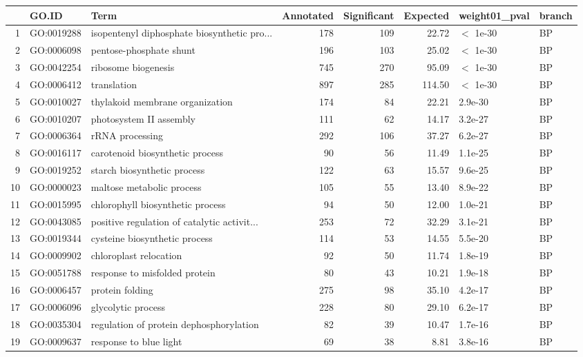 \documentclass[12pt,oneside,a4paper]{article}
\begin{document}
\begin{longtable}{rllrrrll}
  \hline
 & GO.ID & Term & Annotated & Significant & Expected & weight01\_pval & branch \\ 
  \hline
1 & GO:0019288 & isopentenyl diphosphate biosynthetic pro... & 178 & 109 & 22.72 & $<$ 1e-30 & BP \\ 
  2 & GO:0006098 & pentose-phosphate shunt & 196 & 103 & 25.02 & $<$ 1e-30 & BP \\ 
  3 & GO:0042254 & ribosome biogenesis & 745 & 270 & 95.09 & $<$ 1e-30 & BP \\ 
  4 & GO:0006412 & translation & 897 & 285 & 114.50 & $<$ 1e-30 & BP \\ 
  5 & GO:0010027 & thylakoid membrane organization & 174 &  84 & 22.21 & 2.9e-30 & BP \\ 
  6 & GO:0010207 & photosystem II assembly & 111 &  62 & 14.17 & 3.2e-27 & BP \\ 
  7 & GO:0006364 & rRNA processing & 292 & 106 & 37.27 & 6.2e-27 & BP \\ 
  8 & GO:0016117 & carotenoid biosynthetic process &  90 &  56 & 11.49 & 1.1e-25 & BP \\ 
  9 & GO:0019252 & starch biosynthetic process & 122 &  63 & 15.57 & 9.6e-25 & BP \\ 
  10 & GO:0000023 & maltose metabolic process & 105 &  55 & 13.40 & 8.9e-22 & BP \\ 
  11 & GO:0015995 & chlorophyll biosynthetic process &  94 &  50 & 12.00 & 1.0e-21 & BP \\ 
  12 & GO:0043085 & positive regulation of catalytic activit... & 253 &  72 & 32.29 & 3.1e-21 & BP \\ 
  13 & GO:0019344 & cysteine biosynthetic process & 114 &  53 & 14.55 & 5.5e-20 & BP \\ 
  14 & GO:0009902 & chloroplast relocation &  92 &  50 & 11.74 & 1.8e-19 & BP \\ 
  15 & GO:0051788 & response to misfolded protein &  80 &  43 & 10.21 & 1.9e-18 & BP \\ 
  16 & GO:0006457 & protein folding & 275 &  98 & 35.10 & 4.2e-17 & BP \\ 
  17 & GO:0006096 & glycolytic process & 228 &  80 & 29.10 & 6.2e-17 & BP \\ 
  18 & GO:0035304 & regulation of protein dephosphorylation &  82 &  39 & 10.47 & 1.7e-16 & BP \\ 
  19 & GO:0009637 & response to blue light &  69 &  38 & 8.81 & 3.8e-16 & BP \\ 

\end{longtable}
\end{document}
